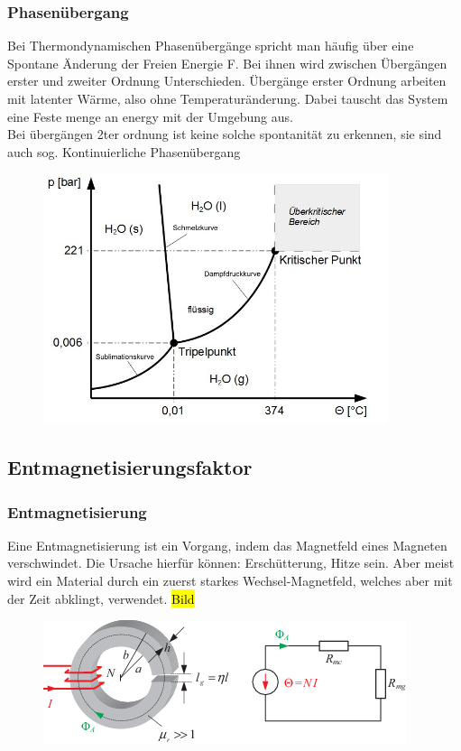         \subsubsection*{Phasenübergang}
            Bei Thermondynamischen Phasenübergänge spricht man häufig über eine Spontane Änderung der Freien Energie F.
            Bei ihnen wird zwischen Übergängen erster und zweiter Ordnung Unterschieden. Übergänge erster Ordnung
            arbeiten mit latenter Wärme, also ohne Temperaturänderung. Dabei tauscht das System eine Feste menge an energy
            mit der Umgebung aus.\\
            Bei übergängen 2ter ordnung ist keine solche spontanität zu erkennen, sie sind auch sog. Kontinuierliche Phasenübergang
            \begin{figure}[H]
                \centering
                \includegraphics[width=0.9\textwidth]{Images/waterphase.jpg}
            \end{figure}
    \subsection{Entmagnetisierungsfaktor}

        \subsubsection*{Entmagnetisierung}
            Eine Entmagnetisierung ist ein Vorgang, indem das Magnetfeld eines Magneten verschwindet.
            Die Ursache hierfür können: Erschütterung, Hitze sein. Aber meist wird ein Material
            durch ein zuerst starkes Wechsel-Magnetfeld, welches aber mit der Zeit abklingt, verwendet.
            \hl{Bild}
            \begin{figure}[H]
                \centering
                \includegraphics{images/Ringkern}
            \end{figure}
